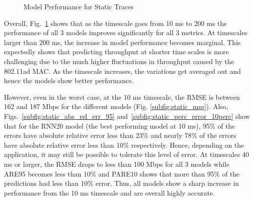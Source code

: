 \documentclass[sigconf,anonymous]{acmart}
\begin{document}
\begin{figure}[h]
\centering
{}
\hfill
{}
\hfill
{}
\caption{Model Performance for Static Traces}
\label{Static Conditions}
\end{figure}

Overall, Fig.~\ref{Static Conditions} shows that as the timescale goes from 10 ms to 200 ms the performance of all 3 models improves significantly for all 3 metrics. At timescales larger than 200 ms, the increase in model performance becomes marginal. This expectedly shows that predicting throughput at shorter time scales is more challenging due to the much higher fluctuations in throughput caused by the 802.11ad MAC. As the timescale increases, the variations get averaged out and hence the models show better performance.

However, even in the worst case, at the 10 ms timescale, the RMSE is between 162 and 187 Mbps for the different models (Fig. \ref{subfig:static_mse}). Also, Figs.~\ref{subfig:static_abs_rel_err_95} and~\ref{subfig:static_perc_error_10perc} show that for the RNN20 model (the best performing model at 10 ms), 95\% of the errors have absolute relative error less than 23\% and nearly 78\% of the errors have absolute relative error less than 10\% respectively. Hence, depending on the application, it may still be possible to tolerate this level of error. At timescales 40 ms or larger, the RMSE drops to less than 100 Mbps for all 3 models while ARE95 becomes less than 10\% and PARE10 shows that more than 95\% of the predictions had less than 10\% error. Thus, all models show a sharp increase in performance from the 10 ms timescale and are overall highly accurate.
\end{document}

